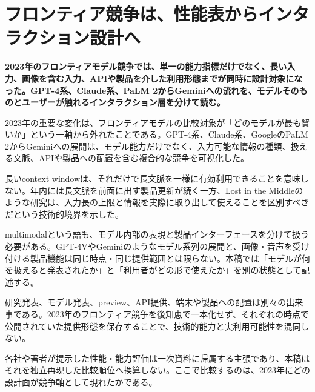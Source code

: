 \section{フロンティア競争は、性能表からインタラクション設計へ}
\label{pkg:frontier-interface}
\noindent\textbf{2023年のフロンティアモデル競争では、単一の能力指標だけでなく、長い入力、画像を含む入力、APIや製品を介した利用形態までが同時に設計対象になった。GPT-4系、Claude系、PaLM 2からGeminiへの流れを、モデルそのものとユーザーが触れるインタラクション層を分けて読む。}\autocite{src-013fa77665db,src-2b6af707f3ef,src-3375c5d27d9b,src-39071a9443e5,src-5bfa9c93d034,src-93d355bf8806,src-a3dead6cff65,src-a95452783369,src-b1525886b462,src-db671ee1d1b8,src-e116708067ab,src-f5041642fb21,src-f951bda6a0f4,src-fd9cb9c0061f}

2023年の重要な変化は、フロンティアモデルの比較対象が「どのモデルが最も賢いか」という一軸から外れたことである。GPT-4系、Claude系、GoogleのPaLM 2からGeminiへの展開は、モデル能力だけでなく、入力可能な情報の種類、扱える文脈、APIや製品への配置を含む複合的な競争を可視化した。\autocite{src-013fa77665db,src-3375c5d27d9b,src-39071a9443e5,src-5bfa9c93d034,src-93d355bf8806,src-a3dead6cff65,src-a95452783369,src-b1525886b462,src-db671ee1d1b8,src-e116708067ab,src-f5041642fb21,src-f951bda6a0f4,src-fd9cb9c0061f}


長いcontext windowは、それだけで長文脈を一様に有効利用できることを意味しない。年内には長文脈を前面に出す製品更新が続く一方、Lost in the Middleのような研究は、入力長の上限と情報を実際に取り出して使えることを区別すべきだという技術的境界を示した。\autocite{src-013fa77665db,src-2b6af707f3ef,src-39071a9443e5,src-93d355bf8806,src-a3dead6cff65,src-b1525886b462,src-db671ee1d1b8,src-f5041642fb21,src-fd9cb9c0061f}


multimodalという語も、モデル内部の表現と製品インターフェースを分けて扱う必要がある。GPT-4VやGeminiのようなモデル系列の展開と、画像・音声を受け付ける製品機能は同じ時点・同じ提供範囲とは限らない。本稿では「モデルが何を扱えると発表されたか」と「利用者がどの形で使えたか」を別の状態として記述する。\autocite{src-3375c5d27d9b,src-5bfa9c93d034,src-93d355bf8806,src-a3dead6cff65,src-a95452783369,src-db671ee1d1b8,src-f951bda6a0f4,src-fd9cb9c0061f}


研究発表、モデル発表、preview、API提供、端末や製品への配置は別々の出来事である。2023年のフロンティア競争を後知恵で一本化せず、それぞれの時点で公開されていた提供形態を保存することで、技術的能力と実利用可能性を混同しない。\autocite{src-013fa77665db,src-3375c5d27d9b,src-39071a9443e5,src-5bfa9c93d034,src-93d355bf8806,src-a3dead6cff65,src-a95452783369,src-b1525886b462,src-db671ee1d1b8,src-e116708067ab,src-f5041642fb21,src-f951bda6a0f4,src-fd9cb9c0061f}


\begin{claimboundary}
各社や著者が提示した性能・能力評価は一次資料に帰属する主張であり、本稿はそれを独立再現した比較順位へ換算しない。ここで比較するのは、2023年にどの設計面が競争軸として現れたかである。\autocite{src-3375c5d27d9b,src-5bfa9c93d034,src-a95452783369,src-f951bda6a0f4}
\end{claimboundary}
